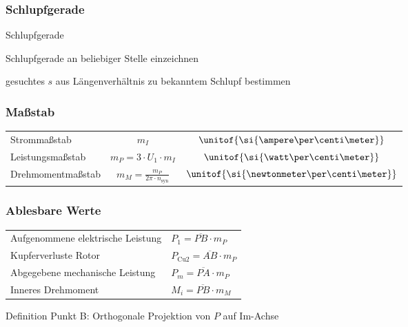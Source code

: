 \begin{sectionbox}
\subsubsection{Schlupfgerade}
\begin{cookbox}{Schlupfgerade}
\item Schlupfgerade an beliebiger Stelle einzeichnen
\item gesuchtes $s$ aus Längenverhältnis zu bekanntem Schlupf bestimmen
\end{cookbox}

\end{sectionbox}

\begin{sectionbox}
\subsubsection{Maßstab}
\begin{symbolbox}
\begin{tabular}{p{2.8cm}cc}
Strommaßstab & $m_I$ & $\unitof{\si{\ampere\per\centi\meter}}$\\
Leistungsmaßstab & $m_P = 3\cdot U_1\cdot m_I$ & $\unitof{\si{\watt\per\centi\meter}}$\\
Drehmomentmaßstab & $m_M = \frac{m_P}{2\pi\cdot n_\text{syn}}$ & $\unitof{\si{\newtonmeter\per\centi\meter}}$
\end{tabular}
\end{symbolbox}

\subsubsection{Ablesbare Werte}
\begin{tabular}{p{4cm}l}
Aufgenommene elektrische Leistung & $P_1 = \overline{PB}\cdot m_P$\\
Kupferverluste Rotor & $P_{\text{Cu}2} = \overline{AB}\cdot m_P$\\
Abgegebene mechanische Leistung & $P_m = \overline{PA}\cdot m_P$\\
Inneres Drehmoment & $M_i = \overline{PB}\cdot m_M$
\end{tabular}
\begin{symbolbox}
  Definition Punkt B: Orthogonale Projektion von $P$ auf Im-Achse
\end{symbolbox}


\end{sectionbox}

